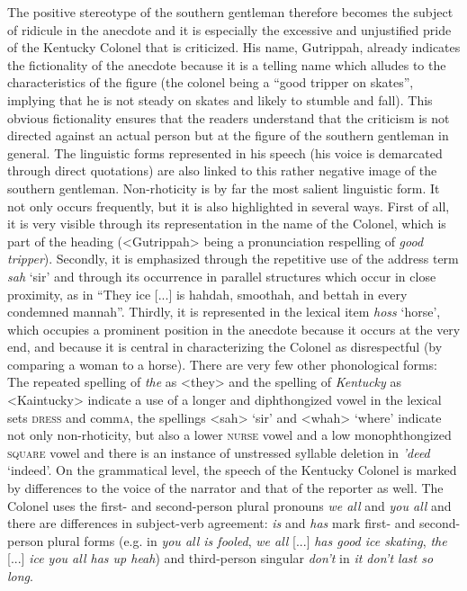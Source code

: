 The positive stereotype of the southern gentleman therefore becomes the subject of ridicule in the anecdote and it is especially the excessive and unjustified pride of the Kentucky Colonel that is criticized. His name, Gutrippah, already indicates the fictionality of the anecdote because it is a telling name which alludes to the characteristics of the figure (the colonel being a “good tripper on skates”, implying that he is not steady on skates and likely to stumble and fall). This obvious fictionality ensures that the readers understand that the criticism is not directed against an actual person but at the figure of the southern gentleman in general. The linguistic forms represented in his speech (his voice is demarcated through direct quotations) are also linked to this rather negative image of the southern gentleman. Non-rhoticity is by far the most salient linguistic form. It not only occurs frequently, but it is also highlighted in several ways. First of all, it is very visible through its representation in the name of the Colonel, which is part of the heading (<Gutrippah> being a pronunciation respelling of \emph{good tripper}). Secondly, it is emphasized through the repetitive use of the address term \emph{sah} ‘sir’ and through its occurrence in parallel structures which occur in close proximity, as in “They ice [...] is hahdah, smoothah, and bettah in every condemned mannah”. Thirdly, it is represented in the lexical item \emph{hoss} ‘horse’, which occupies a prominent position in the anecdote because it occurs at the very end, and because it is central in characterizing the Colonel as disrespectful (by comparing a woman to a horse). There are very few other phonological forms: The repeated spelling of \emph{the} as <they> and the spelling of \emph{Kentucky} as <Kaintucky> indicate a use of a longer and diphthongized vowel in the lexical sets \textsc{dress} and comm\textsc{a}, the spellings <sah> ‘sir’ and <whah> ‘where’ indicate not only non-rhoticity, but also a lower \textsc{nurse} vowel and a low monophthongized \textsc{square} vowel and there is an instance of unstressed syllable deletion in \emph{’deed} ‘indeed’. On the grammatical level, the speech of the Kentucky Colonel is marked by differences to the voice of the narrator and that of the reporter as well. The Colonel uses the first- and second-person plural pronouns \emph{we all} and \emph{you all} and there are differences in subject-verb agreement: \emph{is} and \emph{has} mark first- and second-person plural forms\emph{} (e.g. in \emph{you all is fooled},\emph{ we all} [...]\emph{ has good ice skating},\emph{ the} [...] \emph{ice you all has up heah}) and third-person singular \emph{don’t} in \emph{it don’t last so long}.

